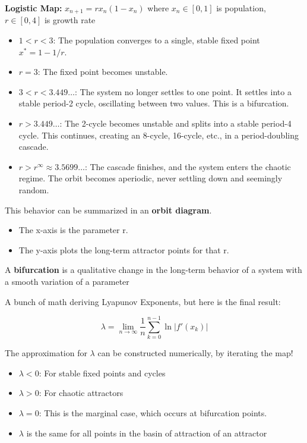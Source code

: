 \textbf{Logistic Map:} $x_{n+1} = r x_n (1 - x_n)$ where $x_n \in [0, 1]$ is 
population, $r \in [0, 4]$ is growth rate

\begin{itemize}
    \item $1<r<3$: The population converges to a single, stable fixed point $x^*=1-1/r$.
    \item $r=3$: The fixed point becomes unstable.
    \item $3<r<3.449\dots$: The system no longer settles to one point. It settles into a stable period-2 cycle, oscillating between two values. This is a bifurcation.
    \item $r>3.449\dots$: The 2-cycle becomes unstable and splits into a stable period-4 cycle. This continues, creating an 8-cycle, 16-cycle, etc., in a period-doubling cascade.
    \item $r>r^{\infty} \approx 3.5699\dots$: The cascade finishes, and the system enters the chaotic regime. The orbit becomes aperiodic, never settling down and seemingly random.
\end{itemize}

This behavior can be summarized in an \textbf{orbit diagram}.
\begin{itemize}
    \item The x-axis is the parameter r.
    \item The y-axis plots the long-term attractor points for that r.
\end{itemize}    

A \textbf{bifurcation} is a qualitative change in the long-term behavior
of a system with a smooth variation of a parameter
    
A bunch of math deriving Lyapunov Exponents, but here is the final result:

\[\lambda = \lim_{n \to \infty} \frac{1}{n} \sum_{k=0}^{n-1} \ln|f'(x_k)|\]

The approximation for $\lambda$ can be constructed numerically, by iterating the map!
\begin{itemize}
    \item $\lambda < 0$: For stable fixed points and cycles
    \item $\lambda > 0$: For chaotic attractors
    \item $\lambda = 0$: This is the marginal case, which occurs at bifurcation points.
    \item $\lambda$ is the same for all points in the basin of attraction of an attractor
\end{itemize} 
    

